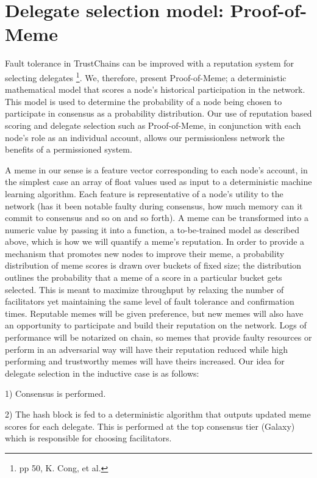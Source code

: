 \documentclass{article}
\begin{document}
\section{Delegate selection model: Proof-of-Meme}
Fault tolerance in TrustChains can be improved with a reputation system for selecting delegates \footnote{pp 50, K. Cong, et al.}. We, therefore, present Proof-of-Meme; a deterministic mathematical model that scores a node's historical participation in the network. This model is used to determine the probability of a node being chosen to participate in consensus as a probability distribution. Our use of reputation based scoring and delegate selection such as Proof-of-Meme, in conjunction with each node's role as an individual account, allows our permissionless network the benefits of a permissioned system.

A meme in our sense is a feature vector corresponding to each node's account, in the simplest case an array of float values used as input to a deterministic machine learning algorithm. Each feature is representative of a node's utility to the network (has it been notable faulty during consensus, how much memory can it commit to consensus and so on and so forth). A meme can be transformed into a numeric value by passing it into a function, a to-be-trained model as described above, which is how we will quantify a meme's reputation. In order to provide a mechanism that promotes new nodes to improve their meme, a probability distribution of meme scores is drawn over buckets of fixed size; the distribution outlines the probability that a meme of a score in a particular bucket gets selected. This is meant to maximize throughput by relaxing the number of facilitators yet maintaining the same level of fault tolerance and confirmation times. Reputable memes will be given preference, but new memes will also have an opportunity to participate and build their reputation on the network. Logs of performance will be notarized on chain, so memes that provide faulty resources or perform in an adversarial way will have their reputation reduced while high performing and trustworthy memes will have theirs increased. Our idea for delegate selection in the inductive case is as follows:

1)	Consensus is performed.

2)	The hash block is fed to a deterministic algorithm that outputs updated meme scores for each delegate. This is performed at the top consensus tier (Galaxy) which is responsible for choosing facilitators.
\end{document}
